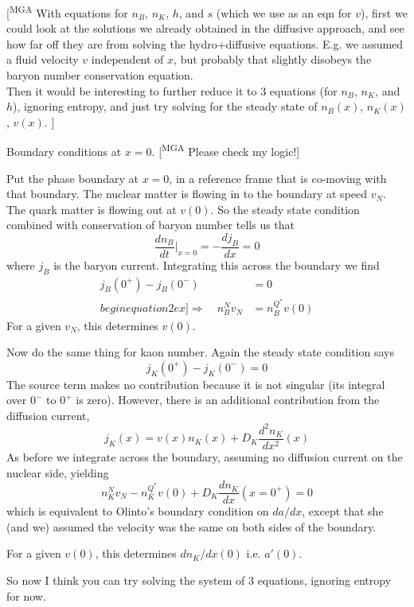 \documentclass[11pt]{article}
\newcommand{\mga}[1]{{\color[rgb]{0.8,0,0}#1}}
\newcommand{\mgacom}[1]{\textsf{\color[rgb]{0.75,0,0}[\textsuperscript{MGA} #1]}}
\begin{document}
\mgacom{
With equations for $n_B$, $n_K$, $h$, and $s$ (which we use as an eqn for $v$), first we could look at the solutions we already obtained in the diffusive approach, and see how far off they are from solving the hydro+diffusive equations. E.g. we assumed a fluid velocity $v$ independent of $x$, but probably that slightly disobeys the baryon number conservation equation.\\
Then it would be interesting to further reduce it to 3 equations (for $n_B$, $n_K$, and $h$), ignoring entropy, and just try solving for the steady state of $n_B(x)$, $n_K(x)$, $v(x)$.
}

\mga{
Boundary conditions at $x=0$. \mgacom{Please check my logic!}

Put the phase boundary at $x=0$, in a reference frame that is co-moving with that boundary.  The nuclear matter is flowing in to the boundary at speed $v_N$. The quark matter is flowing out at $v(0)$. So the steady state condition combined with conservation of baryon number tells us that
\begin{equation}
\dfrac{dn_B}{dt}\Bigr|_{x=0} = -\dfrac{d j_B}{dx} = 0
\end{equation}
where $j_B$ is the baryon current.
Integrating this across the boundary we find
\begin{align*}
j_B(0^+) - j_B(0^-) &= 0 \\begin{equation}2ex]
\Rightarrow\quad
n_B^N v_N &= n_B^{Q^*} v(0)
\end{align*}
For a given $v_N$, this determines $v(0)$.

Now do the same thing for kaon number. Again  the steady state condition says
\begin{equation} j_K(0^+) - j_K(0^-) = 0 \end{equation}
The source term makes no contribution because it is not singular (its integral over $0^-$ to $0^+$ is zero). However, there is an additional contribution from the diffusion current,
\begin{equation}
j_K(x) = v(x) n_K(x) + D_K \dfrac{d^2 n_K}{dx^2}(x)
\end{equation}
As before we integrate across the boundary, assuming no diffusion current on the nuclear side, yielding
\begin{equation}
n_K^N v_N - n_K^{Q^*} v(0) + D_K \dfrac{dn_K}{dx}
(x{=}0^+) = 0
\end{equation}
which is equivalent to Olinto's boundary condition on $da/dx$, except that she (and we) assumed the velocity was the same on both sides of the boundary.

For a given $v(0)$, this determines $dn_K/dx(0)$
i.e. $a'(0)$.

So now I think you can try solving the system of 3 equations, ignoring entropy for now. 
}
\end{document}
